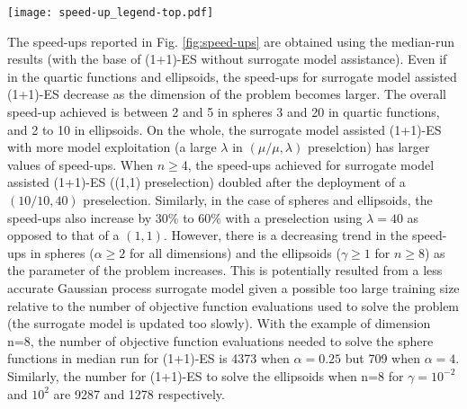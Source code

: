 \begin{center}
\begin{figure*}
    \texttt{[image: speed-up\_legend-top.pdf]}
    \caption{Speed-ups observed in median runs. From top to bottom, each row represents the speed-up observed in the sphere function, quartic function, and ellipsoids function respectively. Whereas each column illustrates a test problem in different dimension and from left to right has dimension $n=2,4,8,16$. Each individual plot shows the speed-ups of surrogate model assisted (1+)-ES with $(\mu/\mu,\lambda)$ preselection where $\lambda=1,10,20,40$ and $\mu=\lceil \lambda /4\rceil$.}
    \label{fig:speed-ups}
\end{figure*}
\end{center}

The speed-ups reported in Fig. \ref{fig:speed-ups} are obtained using the median-run results (with the base of (1+1)-ES without surrogate model assistance). Even if in the quartic functions and ellipsoids, the speed-ups for surrogate model assisted (1+1)-ES decrease as the dimension of the problem becomes larger. The overall speed-up achieved is between 2 and 5 in spheres 3 and 20 in quartic functions, and 2 to 10 in ellipsoids. On the whole, the surrogate model assisted (1+1)-ES with more model exploitation (a large $\lambda$ in $(\mu/\mu,\lambda)$ preselction) has larger values of speed-ups. When $n \geq 4$, the speed-ups achieved for surrogate model assisted (1+1)-ES ((1,1) preselection) doubled after the deployment of a $(10/10,40)$ preselection. Similarly, in the case of spheres and ellipsoids, the speed-ups  also increase by 30\% to 60\% with a preselection using $\lambda=40$ as opposed to that of a $(1,1)$. However, there is a decreasing trend in the speed-ups in spheres ($\alpha \geq 2$ for all dimensions) and the ellipsoids ($\gamma \geq 1$ for $n\geq 8$) as the parameter of the problem increases. This is potentially resulted from a less accurate Gaussian process surrogate model given a possible too large training size relative to the number of objective function evaluations used to solve the problem (the surrogate model is updated too slowly). With the example of dimension n=8, the number of objective function evaluations needed to solve the sphere functions in median run for (1+1)-ES is 4373 when $\alpha=0.25$ but 709 when $\alpha=4$. Similarly, the number for (1+1)-ES to solve the ellipsoids when n=8 for $\gamma = 10^{-2}$ and $10^2$ are 9287 and 1278 respectively. 

